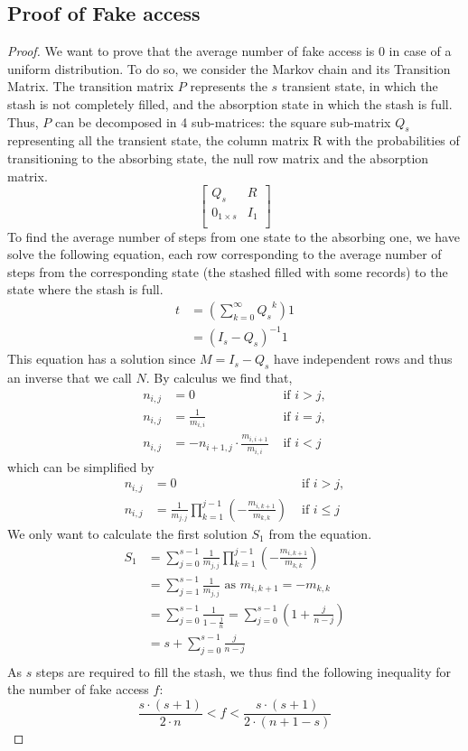 \documentclass{llncs}
\begin{document}
\subsection{Proof of Fake access}
\begin{proof}
 We want to prove that the average number of fake access is 0 in case of a uniform distribution. To do so, we consider the Markov chain and its Transition Matrix.
 The transition matrix $P$ represents the $s$ transient state, in which the stash is not completely filled, and the absorption state in which the stash is full.
Thus, $P$ can be decomposed in 4 sub-matrices: the square sub-matrix $Q_s$ representing all the transient state, the column matrix R with the probabilities of transitioning to the absorbing state, the null row matrix and the absorption matrix.
\[
\begin{bmatrix}
   Q_s & R \\
   0_{1\times s}   & I_1 \\
\end{bmatrix}
\]
To find the average number of steps from one state to the absorbing one, we have solve the following equation, each row corresponding to the average number of steps from the corresponding state (the stashed filled with some records) to the state where the stash is full.
\begin{align*}
 t &= \left (\sum_{k=0}^{\infty} {Q_s}^k \right ) 1 \\
   &= (I_s -Q_s )^{-1} 1
\end{align*}
This equation has a solution since $M=I_s -Q_s$ have independent rows and thus an inverse that we call $N$.
By calculus we find that,
\begin{align*}
 n_{i,j} &= 0 &\text{ if } i>j,\\ 
 n_{i,j} &= \frac{1}{m_{i,i}} &\text{ if } i=j,\\
 n_{i,j} &= - n_{i+1,j } \cdot \frac{m_{i,i+1}}{m_{i,i}} &\text{ if } i<j 
\end{align*}
which can be simplified by
\begin{align*}
 n_{i,j} &= 0 &\text{ if } i>j,\\ 
 n_{i,j} &= \frac{1}{m_{j,j}} \prod_{k=1}^{j-1} \left ( - \frac{m_{i,k+1}}{m_{k,k}}\right ) &\text{ if } i\leq j
\end{align*}
We only want to calculate the first solution $S_1$ from the equation.
\begin{align*}
 S_1 &= \sum_{j=0}^{s-1} \frac{1}{m_{j,j}} \prod_{k=1}^{j-1} \left ( - \frac{m_{i,k+1}}{m_{k,k}}\right ) \\
     &= \sum_{j=1}^{s-1} \frac{1}{m_{j,j}} \text{ as } m_{i,k+1}= -m_{k,k} \\
     &= \sum_{j=0}^{s-1} \frac{1}{1-\frac{j}{n}} = \sum_{j=0}^{s-1} \left (1 + \frac{j}{n-j} \right ) \\
     &= s + \sum_{j=0}^{s-1} \frac{j}{n-j} \\   
\end{align*}
As $s$ steps are required to fill the stash, we thus find the following inequality for the number of fake access $f$:
$$ \frac{s \cdot (s+1)}{2 \cdot n} < f < \frac{s \cdot (s+1)}{2 \cdot (n+1-s)} $$
\end{proof}
\end{document}
